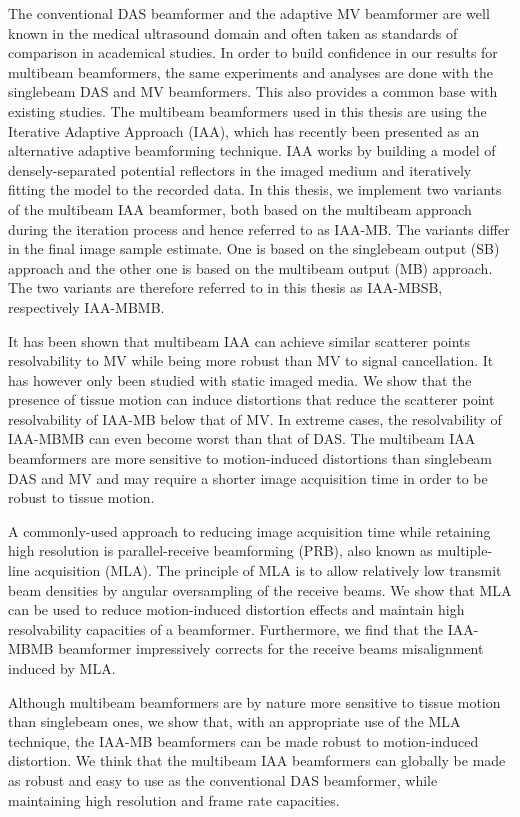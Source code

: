 The conventional DAS beamformer and the adaptive MV beamformer are well known in the medical ultrasound domain and often taken as standards of comparison in academical studies.
In order to build confidence in our results for multibeam beamformers, the same experiments and analyses are done with the singlebeam DAS and MV beamformers. This also provides a common base with existing studies.
The multibeam beamformers used in this thesis are using the Iterative Adaptive Approach (IAA), which has recently been presented as an alternative adaptive beamforming technique.
IAA works by building a model of densely-separated potential reflectors in the imaged medium and iteratively fitting the model to the recorded data.
In this thesis, we implement two variants of the multibeam IAA beamformer, both based on the multibeam approach during the iteration process and hence referred to as IAA-MB.
The variants differ in the final image sample estimate. One is based on the singlebeam output (SB) approach and the other one is based on the multibeam output (MB) approach.
The two variants are therefore referred to in this thesis as IAA-MBSB, respectively IAA-MBMB.

It has been shown that multibeam IAA can achieve similar scatterer points resolvability to MV while being more robust than MV to signal cancellation.
It has however only been studied with static imaged media.
We show that the presence of tissue motion can induce distortions that reduce the scatterer point resolvability of IAA-MB below that of MV.
In extreme cases, the resolvability of IAA-MBMB can even become worst than that of DAS.
The multibeam IAA beamformers are more sensitive to motion-induced distortions than singlebeam DAS and MV and may require a shorter image acquisition time in order to be robust to tissue motion.

A commonly-used approach to reducing image acquisition time while retaining high resolution is parallel-receive beamforming (PRB), also known as multiple-line acquisition (MLA).
The principle of MLA is to allow relatively low transmit beam densities by angular oversampling of the receive beams.
We show that MLA can be used to reduce motion-induced distortion effects and maintain high resolvability capacities of a beamformer.
Furthermore, we find that the IAA-MBMB beamformer impressively corrects for the receive beams misalignment induced by MLA.

Although multibeam beamformers are by nature more sensitive to tissue motion than singlebeam ones, we show that, with an appropriate use of the MLA technique, the IAA-MB beamformers can be made robust to motion-induced distortion.
We think that the multibeam IAA beamformers can globally be made as robust and easy to use as the conventional DAS beamformer, while maintaining high resolution and frame rate capacities.

